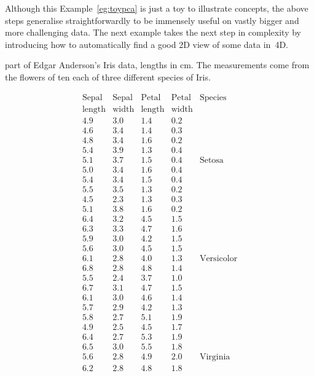 Although this Example~\ref{eg:toypca} is just a toy to illustrate concepts, the above steps generalise straightforwardly to be immensely useful on vastly bigger and more challenging data.
The next example takes the next step in complexity by introducing how to automatically find a good 2D view of some data in~4D.





\begin{example} \label{eg:eaid}
\begin{table}
\caption{part of Edgar Anderson's Iris data, lengths in cm.  The measurements come from the flowers of ten each of three different species of Iris.}
\label{tbl:eaid}
\begin{equation*}
\begin{array}{rrrrl}
\hline
\text{Sepal}&\text{Sepal}&\text{Petal}&\text{Petal}&\text{Species}
\\\text{length}&\text{width}&\text{length}&\text{width}&
\\\hline
  4.9&3.0&1.4&0.2&
\\4.6&3.4&1.4&0.3&
\\4.8&3.4&1.6&0.2&
\\5.4&3.9&1.3&0.4&
\\5.1&3.7&1.5&0.4&\text{Setosa}
\\5.0&3.4&1.6&0.4&
\\5.4&3.4&1.5&0.4&
\\5.5&3.5&1.3&0.2&
\\4.5&2.3&1.3&0.3&
\\5.1&3.8&1.6&0.2&
\\\hline
  6.4&3.2&4.5&1.5&
\\6.3&3.3&4.7&1.6&
\\5.9&3.0&4.2&1.5&
\\5.6&3.0&4.5&1.5&
\\6.1&2.8&4.0&1.3&\text{Versicolor}
\\6.8&2.8&4.8&1.4&
\\5.5&2.4&3.7&1.0&
\\6.7&3.1&4.7&1.5&
\\6.1&3.0&4.6&1.4&
\\5.7&2.9&4.2&1.3&
\\\hline
  5.8&2.7&5.1&1.9&
\\4.9&2.5&4.5&1.7&
\\6.4&2.7&5.3&1.9&
\\6.5&3.0&5.5&1.8&
\\5.6&2.8&4.9&2.0&\text{Virginia}
\\6.2&2.8&4.8&1.8&

\end{array}
\end{equation*}
\end{table}
\end{example}

